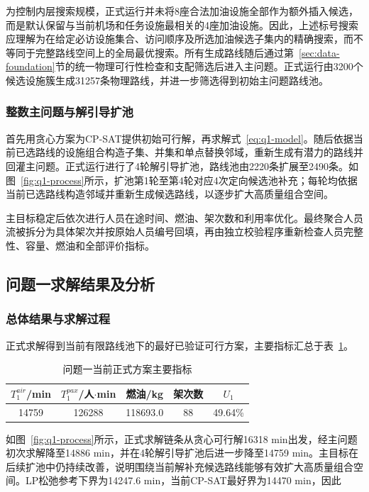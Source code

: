 为控制内层搜索规模，正式运行并未将8座合法加油设施全部作为额外插入候选，而是默认保留与当前机场和任务设施最相关的4座加油设施。因此，上述标号搜索应理解为在给定必访设施集合、访问顺序及所选加油候选子集内的精确搜索，而不等同于完整路线空间上的全局最优搜索。所有生成路线随后通过第~\ref{sec:data-foundation}节的统一物理可行性检查和支配筛选后进入主问题。正式运行由3200个候选设施簇生成31257条物理路线，并进一步筛选得到初始主问题路线池。

\subsubsection{整数主问题与解引导扩池}

首先用贪心方案为CP-SAT提供初始可行解，再求解式~\eqref{eq:q1-model}。随后依据当前已选路线的设施组合构造子集、并集和单点替换邻域，重新生成有潜力的路线并回灌主问题。正式运行进行了4轮解引导扩池，路线池由2220条扩展至2490条。如图~\ref{fig:q1-process}所示，扩池第1轮至第4轮对应4次定向候选池补充；每轮均依据当前已选路线构造邻域并重新生成候选路线，以逐步扩大高质量组合空间。

主目标稳定后依次进行人员在途时间、燃油、架次数和利用率优化。最终聚合人员流被拆分为具体架次并按原始人员编号回填，再由独立校验程序重新检查人员完整性、容量、燃油和全部评价指标。

\subsection{问题一求解结果及分析}\label{subsec:q1-results}

\subsubsection{总体结果与求解过程}

正式求解得到当前有限路线池下的最好已验证可行方案，主要指标汇总于表~\ref{tab:q1-summary}。

\begin{table}[htbp]
\centering
\caption{问题一当前正式方案主要指标}
\label{tab:q1-summary}
\small
\begin{tabular}{c c c c c}
\toprule
$T_1^{air}$/min & $T_1^{pax}$/人$\cdot$min & 燃油/kg & 架次数 & $U_1$\\
\midrule
14759 & 126288 & 118693.0 & 88 & 49.64\%\\
\bottomrule
\end{tabular}
\end{table}

如图~\ref{fig:q1-process}所示，正式求解链条从贪心可行解16318 min出发，经主问题初次求解降至14886 min，并在4轮解引导扩池后进一步降至14759 min。主目标在后续扩池中仍持续改善，说明围绕当前解补充候选路线能够有效扩大高质量组合空间。LP松弛参考下界为14247.6 min，当前CP-SAT最好界为14470 min，因此

